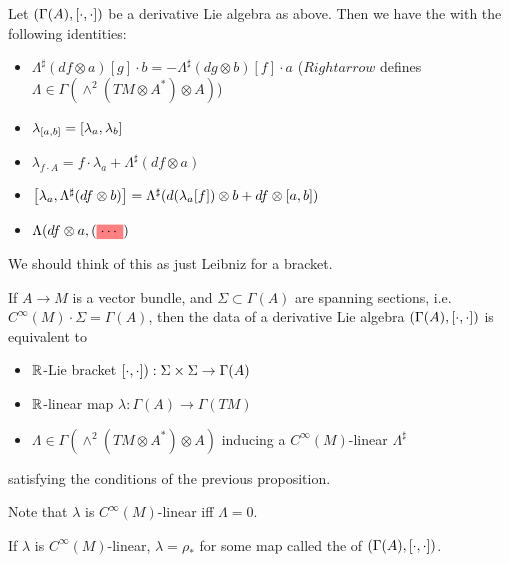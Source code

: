 \documentclass{article}
\begin{document}
\begin{prop}
Let $(\Gamma(A), \comm[\cdot]{\cdot})$ be a derivative Lie algebra as above. Then we have the 
with the following identities: 
\begin{itemize}
    \item $\Lambda^\sharp(df \otimes a)[g] \cdot b = - \Lambda^\sharp(dg \otimes b)[f] \cdot a$ ($Rightarrow$ defines $\Lambda\in \Gamma(\wedge^2(TM \otimes A^\ast)\otimes A)$)
    \item $\lambda_{\comm[a]{b}} = \comm[\lambda_a]{\lambda_b}$ 
    \item $\lambda_{f\cdot A} = f \cdot \lambda_a + \Lambda^\sharp(df \otimes a)$
    \item $\comm[\lambda_a]{\Lambda^\sharp(df \otimes b)} = \Lambda^\sharp(d(\lambda_a[f]) \otimes b + df \otimes \comm[a]{b})$ 
    \item $\Lambda(df \otimes a,\pround{\highlight{\cdots}}$
\end{itemize}
\end{prop}

\begin{remark}
We should think of this as just Leibniz for a bracket. 
\end{remark}

\begin{prop}
If $A \to M$ is a vector bundle, and $\Sigma \subset \Gamma(A)$ are spanning sections, i.e. $C^\infty(M) \cdot \Sigma = \Gamma(A)$, then the data of a derivative Lie algebra $(\Gamma(A), \comm[\cdot]{\cdot})$ is equivalent to 
\begin{itemize}
    \item $\mbb{R}$-Lie bracket $\comm[\cdot]{\cdot}):\Sigma\times \Sigma \to \Gamma(A) $
    \item $\mbb{R}$-linear map $\lambda : \Gamma(A) \to \Gamma(TM)$
    \item $\Lambda \in \Gamma(\wedge^2(TM \otimes A^\ast ) \otimes A)$ inducing a $C^\infty(M)$-linear $\Lambda^\sharp$
\end{itemize}
satisfying the conditions of the previous proposition. 
\end{prop}

Note that $\lambda$ is $C^\infty(M)$-linear iff $\Lambda=0$. 

\begin{definition}
If $\lambda$ is $C^\infty(M)$-linear, $\lambda = \rho_\ast$ for some map
called the  of $(\Gamma(A), \comm[\cdot]{\cdot})$. 
\end{definition}
\end{document}
